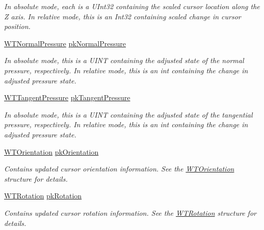 \begin{DoxyCompactItemize}
\begin{DoxyCompactList}\small\item\em In absolute mode, each is a UInt32 containing the scaled cursor location along the Z axis. In relative mode, this is an Int32 containing scaled change in cursor position. \item\end{DoxyCompactList}\item 
\hyperlink{struct_wintab_d_n_1_1_w_t_normal_pressure}{WTNormalPressure} \hyperlink{struct_wintab_d_n_1_1_wintab_packet_a4a3d1c8e15c8ea7c933a3819608ec102}{pkNormalPressure}
\begin{DoxyCompactList}\small\item\em In absolute mode, this is a UINT containing the adjusted state of the normal pressure, respectively. In relative mode, this is an int containing the change in adjusted pressure state. \item\end{DoxyCompactList}\item 
\hyperlink{struct_wintab_d_n_1_1_w_t_tangent_pressure}{WTTangentPressure} \hyperlink{struct_wintab_d_n_1_1_wintab_packet_a182789bf6e328c9ae904daa31ccade5f}{pkTangentPressure}
\begin{DoxyCompactList}\small\item\em In absolute mode, this is a UINT containing the adjusted state of the tangential pressure, respectively. In relative mode, this is an int containing the change in adjusted pressure state. \item\end{DoxyCompactList}\item 
\hyperlink{struct_wintab_d_n_1_1_w_t_orientation}{WTOrientation} \hyperlink{struct_wintab_d_n_1_1_wintab_packet_a75a992e71d4c430f5eb5211e19ca1b32}{pkOrientation}
\begin{DoxyCompactList}\small\item\em Contains updated cursor orientation information. See the \hyperlink{struct_wintab_d_n_1_1_w_t_orientation}{WTOrientation} structure for details. \item\end{DoxyCompactList}\item 
\hyperlink{struct_wintab_d_n_1_1_w_t_rotation}{WTRotation} \hyperlink{struct_wintab_d_n_1_1_wintab_packet_a8a5d64f55e6bfb5ec4d73c842b307876}{pkRotation}
\begin{DoxyCompactList}\small\item\em Contains updated cursor rotation information. See the \hyperlink{struct_wintab_d_n_1_1_w_t_rotation}{WTRotation} structure for details. \item\end{DoxyCompactList}\end{DoxyCompactItemize}


